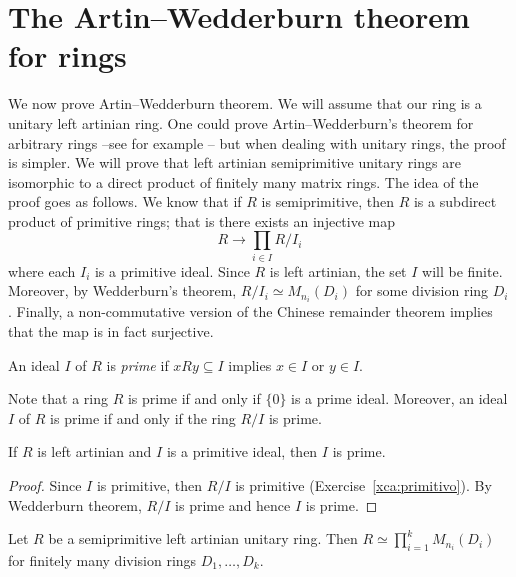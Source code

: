
\section{The Artin--Wedderburn theorem for rings}

We now prove Artin--Wedderburn theorem. We will assume that our ring
is a unitary left artinian ring. One could prove
Artin--Wedderburn's theorem for arbitrary rings --see for example \cite{MR600654}--  
but when dealing with unitary rings, the proof 
is simpler. We will prove
that left artinian semiprimitive unitary rings
are isomorphic to a direct product
of finitely many matrix rings. The idea of the proof goes as follows. 
We know that if 
$R$ is semiprimitive, then $R$ is a subdirect product
of primitive rings; that is  
there exists an injective map
\[
R\to \prod_{i\in I}R/I_i
\]
where each $I_i$ is a primitive ideal. Since $R$ is left artinian, 
the set $I$ will be finite. Moreover, 
by Wedderburn's theorem, 
$R/I_i\simeq M_{n_i}(D_i)$ for some division ring $D_i$. Finally,
a non-commutative version of the Chinese remainder theorem
implies that the map is in fact surjective. 

\begin{definition}
    An ideal $I$ of $R$ is \emph{prime} if $xRy\subseteq I$ implies
    $x\in I$ or $y\in I$.
\end{definition}

Note that a ring $R$ is prime if and only if $\{0\}$ is a prime ideal. 
Moreover, 
an ideal $I$ of $R$ is prime if and only if 
the ring $R/I$ is prime. 

\begin{lemma}
    If $R$ is left artinian and $I$ is a primitive ideal, then
    $I$ is prime. 
\end{lemma}


\begin{proof}
    Since $I$ is primitive, then $R/I$ is primitive (Exercise~\ref{xca:primitivo}). By Wedderburn theorem, 
    $R/I$ is prime and hence $I$ is prime. 
\end{proof}

\begin{theorem}
\label{thm:ArtinWedderburn_version2}
    Let $R$ be a semiprimitive left artinian unitary ring. Then
    $R\simeq\prod_{i=1}^kM_{n_i}(D_i)$ for finitely many
    division rings $D_1,\dots,D_k$. 
\end{theorem}

